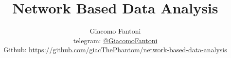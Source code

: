 

\title{\Huge\textbf{{Network Based Data Analysis}}}

\author{
  Giacomo Fantoni \\
  \small telegram: \href{https://t.me/GiacomoFantoni}{@GiacomoFantoni} \\[3pt]
  \small Github: \href{https://github.com/giacThePhantom/network-based-data-analysis}{https://github.com/giacThePhantom/network-based-data-analysis}\\
}




  \maketitle
  \tableofcontents
  


